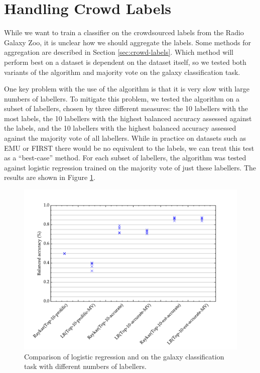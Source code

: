 \section{Handling Crowd Labels}
\label{sec:rgz-crowd-labels}

  While we want to train a classifier on the crowdsourced labels from the Radio
  Galaxy Zoo, it is unclear how we should aggregate the labels. Some methods for
  aggregation are described in Section \ref{sec:crowd-labels}. Which method will
  perform best on a dataset is dependent on the dataset itself, so we tested
  both variants of the \citeauthor{raykar10} algorithm and majority vote on the
  galaxy classification task.

  One key problem with the use of the \citeauthor{raykar10} algorithm is that it
  is very slow with large numbers of labellers. To mitigate this problem, we
  tested the algorithm on a subset of labellers, chosen by three different
  measures: the 10 labellers with the most labels, the 10 labellers with the
  highest balanced accuracy assessed against the \citeauthor{norris06} labels,
  and the 10 labellers with the highest balanced accuracy assessed against the
  majority vote of all labellers. While in practice on datasets such as EMU or
  FIRST there would be no equivalent to the \citeauthor{norris06} labels, we can
  treat this test as a ``best-case'' method. For each subset of labellers, the
  \citeauthor{raykar10} algorithm was tested against logistic regression trained
  on the majority vote of just these labellers. The results are shown in Figure
  \ref{fig:rgz-raykar}.

  \begin{figure}[!ht]
    \centering
    \includegraphics[width=\textwidth]{images/experiments/rgz_raykar}
    \caption{Comparison of logistic regression and \citeauthor{raykar10} on the
      galaxy classification task with different numbers of labellers.}
    \label{fig:rgz-raykar}
  \end{figure}

